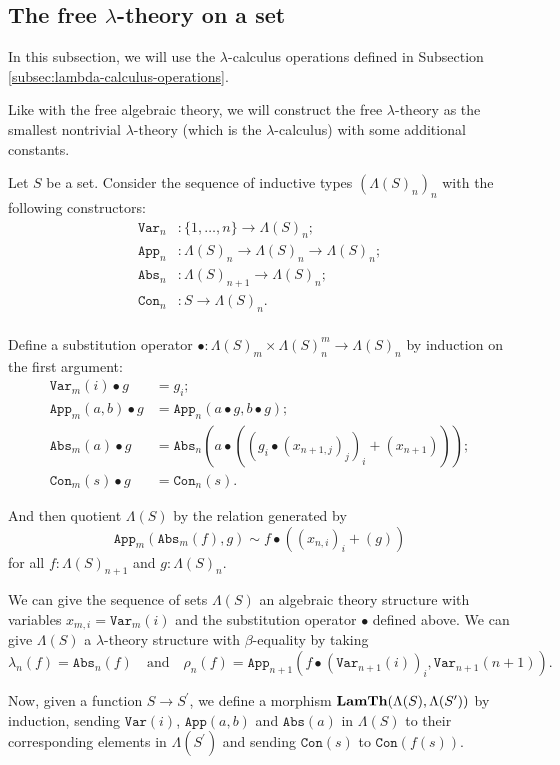 \subsection{The free \texorpdfstring{$ \lambda $}{lambda}-theory on a set}

In this subsection, we will use the $ \lambda $-calculus operations defined in Subsection \ref{subsec:lambda-calculus-operations}.

Like with the free algebraic theory, we will construct the free $ \lambda $-theory as the smallest nontrivial $ \lambda $-theory (which is the $ \lambda $-calculus) with some additional constants.

Let $ S $ be a set. Consider the sequence of inductive types $ (\Lambda(S)_n)_n $ with the following constructors:
\begin{align*}
  \mathtt{Var}_n &: \{ 1, \dots, n \} \to \Lambda(S)_n;\\
  \mathtt{App}_n &: \Lambda(S)_n \to \Lambda(S)_n \to \Lambda(S)_n;\\
  \mathtt{Abs}_n &: \Lambda(S)_{n + 1} \to \Lambda(S)_n;\\
  \mathtt{Con}_n &: S \to \Lambda(S)_n.\\
\end{align*}

Define a substitution operator $ \bullet: \Lambda(S)_m \times \Lambda(S)_n^m \to \Lambda(S)_n $ by induction on the first argument:
\begin{align*}
  \mathtt{Var}_m(i) \bullet g &= g_i;\\
  \mathtt{App}_m(a, b) \bullet g &= \mathtt{App}_n(a \bullet g, b \bullet g);\\
  \mathtt{Abs}_m(a) \bullet g &= \mathtt{Abs}_n(a \bullet ((g_i \bullet (x_{n + 1, j})_j)_i + (x_{n + 1})));\\
  \mathtt{Con}_m(s) \bullet g &= \mathtt{Con}_n(s).
\end{align*}

And then quotient $ \Lambda(S) $ by the relation generated by
\[ \mathtt{App}_m(\mathtt{Abs}_m(f), g) \sim f \bullet ((x_{n, i})_i + (g)) \]
for all $ f: \Lambda(S)_{n + 1} $ and $ g: \Lambda(S)_n $.

\begin{example}\label{ex:free-lambda-theory}
  We can give the sequence of sets $ \Lambda(S) $ an algebraic theory structure with variables $ x_{m, i} = \mathtt{Var}_m(i) $ and the substitution operator $ \bullet $ defined above. We can give $ \Lambda(S) $ a $ \lambda $-theory structure with $ \beta $-equality by taking
  \[ \lambda_n(f) = \mathtt{Abs}_n(f) \quad \text{and} \quad \rho_n(f) = \mathtt{App}_{n + 1}(f \bullet (\mathtt{Var}_{n + 1}(i))_i, \mathtt{Var}_{n + 1}(n + 1)). \]

  Now, given a function $ S \to S^\prime $, we define a morphism $ \mathbf{LamTh}(\Lambda(S), \Lambda(S^\prime)) $ by induction, sending $ \mathtt{Var}(i) $, $ \mathtt{App}(a, b) $ and $ \mathtt{Abs}(a) $ in $ \Lambda(S) $ to their corresponding elements in $ \Lambda(S^\prime) $ and sending $ \mathtt{Con}(s) $ to $ \mathtt{Con}(f(s)) $.
\end{example}

